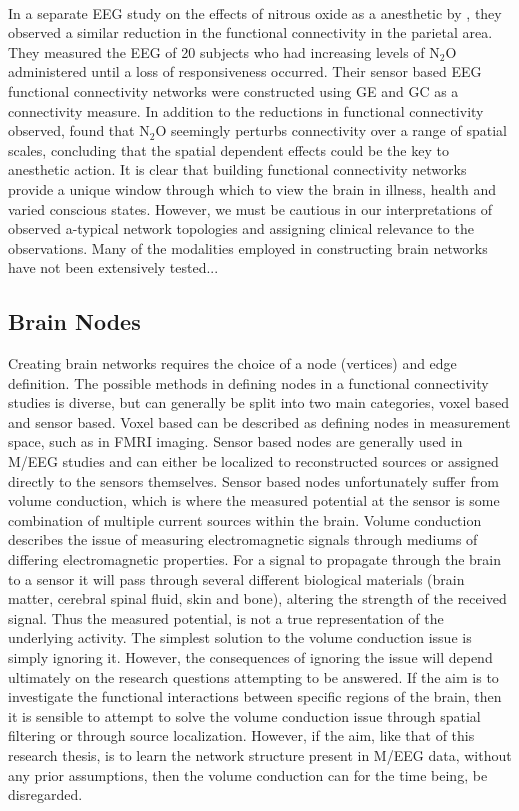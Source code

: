 \documentclass[11pt]{article}
\begin{document}
\\
In a separate EEG study on the effects of nitrous oxide as a anesthetic by \citet{kuhl}, they observed a similar reduction in the functional connectivity in the parietal area. They measured the EEG of 20 subjects who had increasing levels of N$_2$O administered until a loss of responsiveness occurred. Their sensor based EEG functional connectivity networks were constructed using GE and GC as a connectivity measure. In addition to the reductions in functional connectivity observed, \citet{kuhl} found that  N$_2$O seemingly perturbs connectivity over a range of spatial scales, concluding that the spatial dependent effects could be the key to anesthetic action. It is clear that building functional connectivity networks provide a unique window through which to view the brain in illness, health and varied conscious states. However, we must be cautious in our interpretations of observed a-typical network topologies and assigning clinical relevance to the observations. Many of the modalities employed in constructing brain networks have not been extensively tested...


\subsection{Brain Nodes}
Creating brain networks requires the choice of a node (vertices) and edge definition. The possible methods in defining nodes in a functional connectivity studies is diverse, but can generally be split into two main categories, voxel based and sensor based. Voxel based can be described as defining nodes in measurement space, such as in FMRI imaging. Sensor based nodes are generally used in M/EEG studies and can either be localized to reconstructed sources or assigned directly to the sensors themselves. Sensor based nodes unfortunately suffer from volume conduction, which is where the measured potential at the sensor is some combination of multiple current sources within the brain. Volume conduction describes the issue of measuring electromagnetic signals through mediums of differing electromagnetic properties. For a signal to propagate through the brain to a sensor it will pass through several different biological materials (brain matter, cerebral spinal fluid, skin and bone), altering the strength of the received signal. Thus the measured potential, is not a true representation of the underlying activity. The simplest solution to the volume conduction issue is simply ignoring it. However, the consequences of ignoring the issue will depend ultimately on the research questions attempting to be answered. If the aim is to investigate the functional interactions between specific regions of the brain, then it is sensible to attempt to solve the volume conduction issue through spatial filtering or through source localization. However, if the aim, like that of this research thesis, is to learn the network structure present in M/EEG data, without any prior assumptions, then the volume conduction can for the time being, be disregarded.
 
\end{document}
